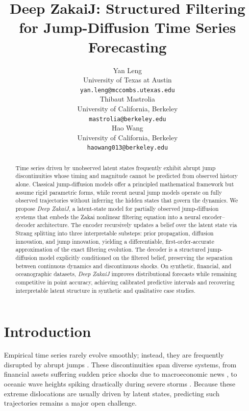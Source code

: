 \documentclass{article}
\title{Deep ZakaiJ: Structured Filtering for Jump-Diffusion Time Series Forecasting}
\author{Yan Leng \\
University of Texas at Austin\\
\texttt{yan.leng@mccombs.utexas.edu} \\
\And
Thibaut Mastrolia \\
University of California, Berkeley\\
\texttt{mastrolia@berkeley.edu} \\
\And
Hao Wang \\
University of California, Berkeley\\
\texttt{haowang013@berkeley.edu}}
\begin{document}
\maketitle

\begin{abstract}
Time series driven by unobserved latent states frequently exhibit abrupt jump discontinuities whose timing and magnitude cannot be predicted from observed history alone. Classical jump-diffusion models offer a principled mathematical framework but assume rigid parametric forms, while recent neural jump models operate on fully observed trajectories without inferring the hidden states that govern the dynamics. We propose \textit{Deep ZakaiJ}, a latent-state model for partially observed jump-diffusion systems that embeds the Zakai nonlinear filtering equation into a neural encoder--decoder architecture. The encoder recursively updates a belief over the latent state via Strang splitting into three interpretable substeps: prior propagation, diffusion innovation, and jump innovation, yielding a differentiable, first-order-accurate approximation of the exact filtering evolution. The decoder is a structured jump-diffusion model explicitly conditioned on the filtered belief, preserving the separation between continuous dynamics and discontinuous shocks. On synthetic, financial, and oceanographic datasets, \textit{Deep ZakaiJ} improves distributional forecasts while remaining competitive in point accuracy, achieving calibrated predictive intervals and recovering interpretable latent structure in synthetic and qualitative case studies.
\end{abstract}

\section{Introduction}
Empirical time series rarely evolve smoothly; instead, they are frequently disrupted by abrupt jumps \citep{aminikhanghahi2017survey, short2013improved}. These discontinuities span diverse systems, from financial assets suffering sudden price shocks due to macroeconomic news \citep{merton1976option}, to oceanic wave heights spiking drastically during severe storms \citep{young2011global, young1988parametric}. Because these extreme dislocations are usually driven by latent states, predicting such trajectories remains a major open challenge.
\end{document}
